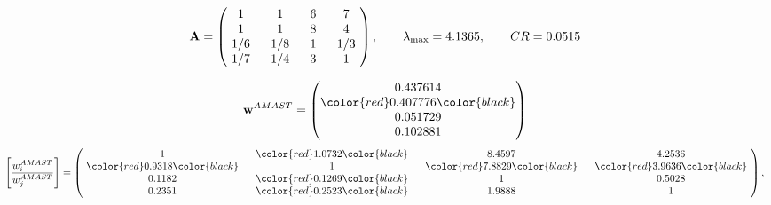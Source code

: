 \begin{example}
\begin{equation*}
\mathbf{A} =
\begin{pmatrix}
$\,\,$ 1 $\,\,$ & $\,\,$1$\,\,$ & $\,\,$6$\,\,$ & $\,\,$7 $\,\,$ \\
$\,\,$ 1 $\,\,$ & $\,\,$ 1 $\,\,$ & $\,\,$8$\,\,$ & $\,\,$4 $\,\,$ \\
$\,\,$ 1/6$\,\,$ & $\,\,$ 1/8$\,\,$ & $\,\,$ 1 $\,\,$ & $\,\,$ 1/3 $\,\,$ \\
$\,\,$ 1/7$\,\,$ & $\,\,$ 1/4$\,\,$ & $\,\,$3$\,\,$ & $\,\,$ 1  $\,\,$ \\
\end{pmatrix},
\qquad
\lambda_{\max} =
4.1365,
\qquad
CR = 0.0515
\end{equation*}

\begin{equation*}
\mathbf{w}^{AMAST} =
\begin{pmatrix}
0.437614\\
\color{red} 0.407776\color{black} \\
0.051729\\
0.102881
\end{pmatrix}\end{equation*}
\begin{equation*}
\left[ \frac{{w}^{AMAST}_i}{{w}^{AMAST}_j} \right] =
\begin{pmatrix}
$\,\,$ 1 $\,\,$ & $\,\,$\color{red} 1.0732\color{black} $\,\,$ & $\,\,$8.4597$\,\,$ & $\,\,$4.2536$\,\,$ \\
$\,\,$\color{red} 0.9318\color{black} $\,\,$ & $\,\,$ 1 $\,\,$ & $\,\,$\color{red} 7.8829\color{black} $\,\,$ & $\,\,$\color{red} 3.9636\color{black}   $\,\,$ \\
$\,\,$0.1182$\,\,$ & $\,\,$\color{red} 0.1269\color{black} $\,\,$ & $\,\,$ 1 $\,\,$ & $\,\,$0.5028 $\,\,$ \\
$\,\,$0.2351$\,\,$ & $\,\,$\color{red} 0.2523\color{black} $\,\,$ & $\,\,$1.9888$\,\,$ & $\,\,$ 1  $\,\,$ \\
\end{pmatrix},
\end{equation*}


\end{example}
